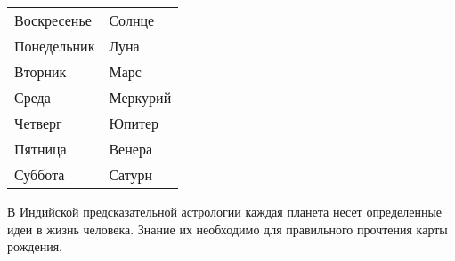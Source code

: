 \begin{table}[tph!]
	\renewcommand{\arraystretch}{1}

	\begin{tabular}{ll}
		Воскресенье & Солнце \\
		Понедельник & Луна \\
		Вторник     & Марс \\
		Среда       & Меркурий \\
		Четверг     & Юпитер \\
		Пятница     & Венера \\
		Суббота     & Сатурн \\
	\end{tabular}
\end{table}

В Индийской предсказательной астрологии каждая планета несет определенные идеи в жизнь человека. Знание их необходимо для правильного прочтения карты рождения.

